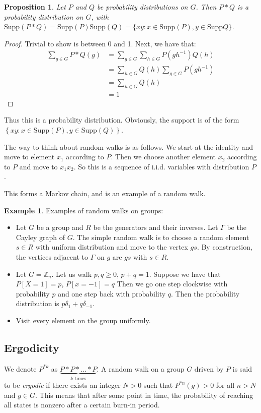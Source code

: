 \documentclass[]{article}
\newtheorem{proposition}[theorem]{Proposition}
\theoremstyle{definition}
\newtheorem{example}[theorem]{Example}
\numberwithin{theorem}{section}
\numberwithin{equation}{section}
\newcommand{\supp}{\text{Supp}}
\begin{document}
\begin{proposition}
	Let $P$ and $Q$ be probability distributions on $G$. Then $P \ast Q$ is a probability distribution on $G$, with $\supp(P \ast Q) = \supp(P)\supp(Q) = \lbrace xy : x \in \supp(P), y \in \supp Q \rbrace$. 
\end{proposition}
\begin{proof}
	Trivial to show is between 0 and 1.
	Next, we have that:
	\begin{align*}
		\sum_{g \in G} P \ast Q(g) &= \sum_{g \in G} \sum_{h \in G} P(gh^{-1}) Q(h)\\
		&=\sum_{h \in G} Q(h) \sum_{g \in G} P(gh^{-1})\\
		&= \sum_{h \in G} Q(h)\\
		&= 1
	\end{align*}
\end{proof}
Thus this is a probability distribution. Obviously, the support is of the form $\left\{ xy : x \in \supp(P), y \in \supp(Q) \right\}$. 

The way to think about random walks is as follows. We start at the identity and move to element $x_1$ according to $P$. Then we choose another element $x_2$ according to $P$ and move to $x_1 x_2$. So this is a sequence of i.i.d. variables with distribution $P$.

This forms a Markov chain, and is an example of a random walk.

\begin{example}
	Examples of random walks on groups:
	\begin{itemize}
		\item Let $G$ be a group and $R$ be the generators and their inverses. Let $\Gamma$ be the Cayley graph of $G$. The simple random walk is to choose a random element $s \in R$ with uniform distribution and move to the vertex $gs$. By construction, the vertices adjacent to $\Gamma$ on $g$ are $gs$ with $s \in R$.
		\item Let $G = \mathbb{Z}_n$. Let us walk  $p, q \geq 0$, $p + q = 1$. Suppose we have that $P[X = 1] = p$, $P[x = -1] = q$ Then we go one step clockwise with probability $p$ and one step back with probability $q$. Then the probability distribution is $p \delta_1 + q \delta_{-1}$. 
		\item Visit every element on the group uniformly. 
	\end{itemize}
\end{example}


\subsection{Ergodicity}
We denote $P^{\ast k}$ as $\underbrace{P \ast P \ast ... \ast P}_{k \text{ times}}$. 
A random walk on a group $G$ driven by $P$ is said to be \textit{ergodic} if there exists an integer $N > 0$ such that $P^{\ast n}(g) > 0$ for all $n > N$ and $g \in G$. This means that after some point in time, the probability of reaching all states is nonzero after a certain burn-in period.
\end{document}
